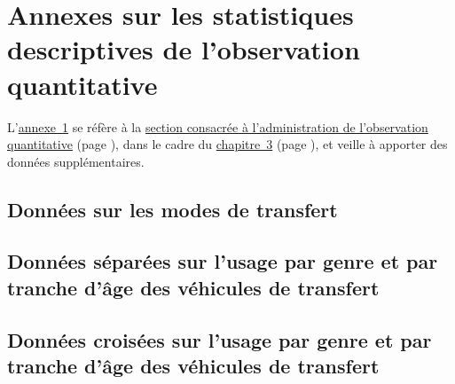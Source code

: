     \setcounter{section}{0}
\chapter{Annexes sur les statistiques descriptives de l'observation quantitative}
    \label{annexes:observation}

L'\hyperref[annexes:observation]{annexe~\ref{annexes:observation}} se réfère à la \hyperref[chap3:observation-quantitative]{section consacrée à l'administration de l'observation quantitative} (page \pageref{chap3:observation-quantitative}), dans le cadre du \hyperref[chap3:titre]{chapitre~3} (page \pageref{chap3:titre}), et veille à apporter des données supplémentaires.%

    \setcounter{tocdepth}{2}
    \renewcommand{\localcontentsname}{Structure de l'annexe~\ref{annexes:observation}}
\localtableofcontents

    \newpage
\section{Données sur les modes de transfert}
    \label{annexes:observation-modes}


\section{Données séparées sur l'usage par genre et par tranche d'âge des véhicules de transfert}
    \label{annexes:observation-genre-age-separes}


\section{Données croisées sur l'usage par genre et par tranche d'âge des véhicules de transfert}
    \label{annexes:observation-genre-age-croises}

